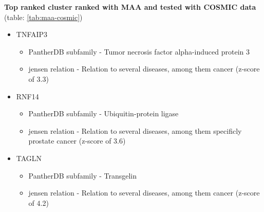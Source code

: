 \textbf{Top ranked cluster ranked with MAA and tested with COSMIC data}
(table: \ref{tab:maa-cosmic})

\begin{itemize}
    \item TNFAIP3
        \begin{itemize}
            \item PantherDB subfamily - Tumor necrosis factor alpha-induced
                protein 3
            \item \gls{jensen} relation - Relation to several diseases, among them
                cancer (z-score of 3.3)
        \end{itemize}
    \item RNF14
        \begin{itemize}
            \item PantherDB subfamily - Ubiquitin-protein ligase
            \item \gls{jensen} relation - Relation to several diseases, among them
                specificly prostate cancer (z-score of 3.6)
        \end{itemize}
    \item TAGLN
        \begin{itemize}
            \item PantherDB subfamily - Transgelin
            \item \gls{jensen} relation - Relation to several diseases, among them
                cancer (z-score of 4.2)
        \end{itemize}
\end{itemize}

